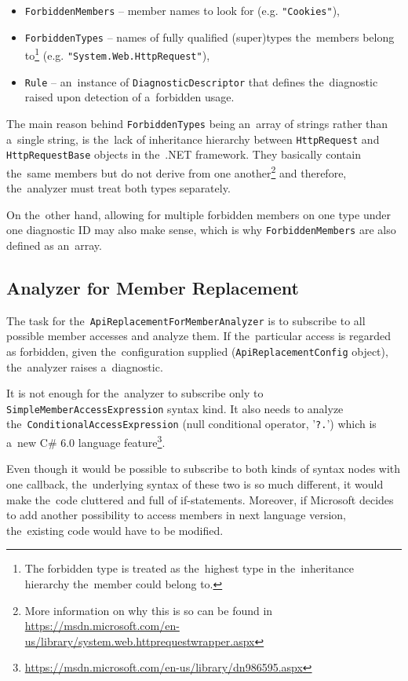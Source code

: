 \documentclass[
  digital, %
  table,   %
  lof,     %
  lot,     %
  oneside,
]{fithesis3}
\begin{document}
\begin{itemize}
  \item \texttt{ForbiddenMembers} -- member names to look for (e.g. \texttt{"Cookies"}), 
  \item \texttt{ForbiddenTypes} -- names of fully qualified (super)types the~members belong to\footnote{The forbidden type is treated as the~highest type in the~inheritance hierarchy the~member could belong to.
} (e.g. \texttt{"System.Web.HttpRequest"}), 
  \item \texttt{Rule} -- an~instance of \texttt{DiagnosticDescriptor} that defines the~diagnostic raised upon detection of a~forbidden usage.
\end{itemize} 

The main reason behind \texttt{ForbiddenTypes} being an~array of strings rather than a~single string, is the~lack of inheritance hierarchy between \texttt{HttpRequest} and \texttt{HttpRequestBase} objects in the~.NET framework. They basically contain the~same members but do not derive from one another\footnote{More information on why this is so can be found in \url{https://msdn.microsoft.com/en-us/library/system.web.httprequestwrapper.aspx}} and therefore, the~analyzer must treat both types separately. 

On the~other hand, allowing for multiple forbidden members on one type under one diagnostic ID may also make sense, which is why \texttt{ForbiddenMembers} are also defined as an~array.

\subsection{Analyzer for Member Replacement}
The task for the~\texttt{ApiReplacementForMemberAnalyzer} is to subscribe to all possible member accesses and analyze them. If the~particular access is regarded as forbidden, given the~configuration supplied (\texttt{ApiReplacementConfig} object), the~analyzer raises a~diagnostic.

It is not enough for the~analyzer to subscribe only to \texttt{SimpleMemberAccessExpression} syntax kind. It also needs to analyze the~\texttt{ConditionalAccessExpression} (null conditional operator, '\texttt{?.}') which is a~new C\# 6.0 language feature\footnote{\url{https://msdn.microsoft.com/en-us/library/dn986595.aspx}}. 

Even though it would be possible to subscribe to both kinds of syntax nodes with one callback, the~underlying syntax of these two is so much different, it would make the~code cluttered and full of if-statements. Moreover, if Microsoft decides to add another possibility to access members in next language version, the~existing code would have to be modified.
\end{document}
